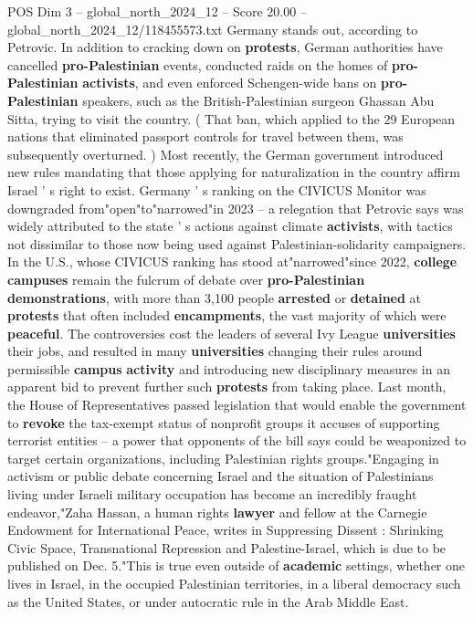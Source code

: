 \begin{textsample}{POS Dim 3 – global\_north\_2024\_12 – Score 20.00 – global\_north\_2024\_12/118455573.txt}
Germany stands out, according to Petrovic.
In addition to cracking down on \textbf{protests}, German authorities have cancelled \textbf{pro-Palestinian} events, conducted raids on the homes of \textbf{pro-Palestinian} \textbf{activists}, and even enforced Schengen-wide bans on \textbf{pro-Palestinian} speakers, such as the British-Palestinian surgeon Ghassan Abu Sitta, trying to visit the country. ( That ban, which applied to the 29 European nations that eliminated passport controls for travel between them, was subsequently overturned. ) Most recently, the German government introduced new rules mandating that those applying for naturalization in the country affirm Israel ' s right to exist.
Germany ' s ranking on the CIVICUS Monitor was downgraded from"open"to"narrowed"in 2023 -- a relegation that Petrovic says was widely attributed to the state ' s actions against climate \textbf{activists}, with tactics not dissimilar to those now being used against Palestinian-solidarity campaigners.
In the U.S., whose CIVICUS ranking has stood at"narrowed"since 2022, \textbf{college} \textbf{campuses} remain the fulcrum of debate over \textbf{pro-Palestinian} \textbf{demonstrations}, with more than 3,100 people \textbf{arrested} or \textbf{detained} at \textbf{protests} that often included \textbf{encampments}, the vast majority of which were \textbf{peaceful}.
The controversies cost the leaders of several Ivy League \textbf{universities} their jobs, and resulted in many \textbf{universities} changing their rules around permissible \textbf{campus} \textbf{activity} and introducing new disciplinary measures in an apparent bid to prevent further such \textbf{protests} from taking place.
Last month, the House of Representatives passed legislation that would enable the government to \textbf{revoke} the tax-exempt status of nonprofit groups it accuses of supporting terrorist entities -- a power that opponents of the bill says could be weaponized to target certain organizations, including Palestinian rights groups."Engaging in activism or public debate concerning Israel and the situation of Palestinians living under Israeli military occupation has become an incredibly fraught endeavor,"Zaha Hassan, a human rights \textbf{lawyer} and fellow at the Carnegie Endowment for International Peace, writes in Suppressing Dissent : Shrinking Civic Space, Transnational Repression and Palestine-Israel, which is due to be published on Dec. 5."This is true even outside of \textbf{academic} settings, whether one lives in Israel, in the occupied Palestinian territories, in a liberal democracy such as the United States, or under autocratic rule in the Arab Middle East.

\end{textsample}
